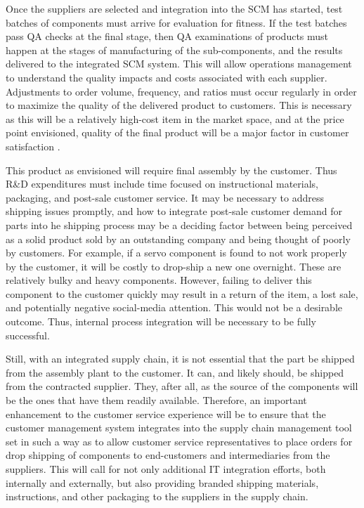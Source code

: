 \documentclass[man]{apa7}
\begin{document}
Once the suppliers are selected and integration into the SCM has started, test batches of components must arrive for evaluation for fitness. If the test batches pass QA checks at the final stage, then QA examinations of products must happen at the stages of manufacturing of the sub-components, and the results delivered to the integrated SCM system. This will allow operations management to understand the quality impacts and costs associated with each supplier. Adjustments to order volume, frequency, and ratios must occur regularly in order to maximize the quality of the delivered product to customers. This is necessary as this will be a relatively high-cost item in the market space, and at the price point envisioned, quality of the final product will be a major factor in customer satisfaction \parencite{yoonSystematicApproachPrioritizing2020}.

This product as envisioned will require final assembly by the customer. Thus R\&D expenditures must include time focused on instructional materials, packaging, and post-sale customer service. It may be necessary to address shipping issues promptly, and how to integrate post-sale customer demand for parts into he shipping process may be a deciding factor between being perceived as a solid product sold by an outstanding company and being thought of poorly by customers. For example, if a servo component is found to not work properly by the customer, it will be costly to drop-ship a new one overnight. These are relatively bulky and heavy components. However, failing to deliver this component to the customer quickly may result in a return of the item, a lost sale, and potentially negative social-media attention.  This would not be a desirable outcome. Thus, internal process integration will be necessary to be fully successful.

Still, with an integrated supply chain, it is not essential that the part be shipped from the assembly plant to the customer. It can, and likely should, be shipped from the contracted supplier. They, after all, as the source of the components will be the ones that have them readily available. Therefore, an important enhancement to the customer service experience will be to ensure that the customer management system integrates into the supply chain management tool set in such a way as to allow customer service representatives to place orders for drop shipping of components to end-customers and intermediaries from the suppliers. This will call for not only additional IT integration efforts, both internally and externally, but also providing branded shipping materials, instructions, and other packaging to the suppliers in the supply chain.
\end{document}
